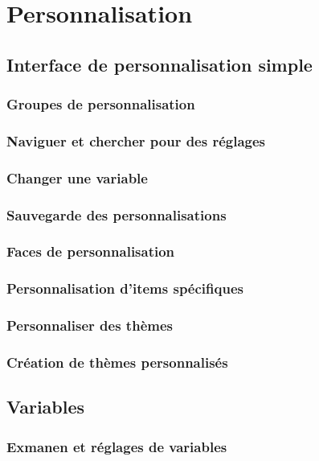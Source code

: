 \chapter{Personnalisation}\label{chap33}
\section{Interface de personnalisation simple}\label{chap33sec1}
\subsection{Groupes de personnalisation}\label{chap33sec1subsec1}
\subsection{Naviguer et chercher pour des réglages}\label{chap33sec1subsec2}
\subsection{Changer une variable}\label{chap33sec1subsec3}
\subsection{Sauvegarde des personnalisations}\label{chap33sec1subsec4}
\subsection{Faces de personnalisation}\label{chap33sec1subsec5}
\subsection{Personnalisation d'items spécifiques}\label{chap33sec1subsec6}
\subsection{Personnaliser des thèmes}\label{chap33sec1subsec7}
\subsection{Création de thèmes personnalisés}\label{chap33sec1subsec8}
\section{Variables}\label{chap33sec2}
\subsection{Exmanen et réglages de variables}\label{chap33sec2subsec1}
